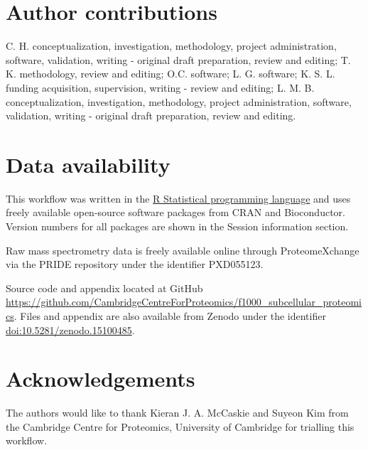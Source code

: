 \documentclass[9pt,a4paper,]{extarticle}
\begin{document}
\section{Author contributions}\label{author-contributions}

C. H. conceptualization, investigation, methodology, project administration,
software, validation, writing - original draft preparation, review and editing;
T. K. methodology, review and editing; O.C. software; L. G. software; K. S. L.
funding acquisition, supervision, writing - review and editing; L. M. B.
conceptualization, investigation, methodology, project administration, software,
validation, writing - original draft preparation, review and editing.

\section{Data availability}\label{data-availability}

This workflow was written in the \href{https://www.r-project.org}{R Statistical programming language} and uses
freely available open-source software packages from CRAN and Bioconductor.
Version numbers for all packages are shown in the Session information section.

Raw mass spectrometry data is freely available online through ProteomeXchange
via the PRIDE repository under the identifier PXD055123.

Source code and appendix located at GitHub \url{https://github.com/CambridgeCentreForProteomics/f1000_subcellular_proteomics}. Files and appendix are also available from Zenodo under the
identifier \href{http://doi.org/10.5281/zenodo.15100485}{doi:10.5281/zenodo.15100485}.

\section{Acknowledgements}\label{acknowledgements}

The authors would like to thank Kieran J. A. McCaskie and Suyeon Kim from the
Cambridge Centre for Proteomics, University of Cambridge for trialling this workflow.

\renewcommand\refname{References}
{\small}
\end{document}
